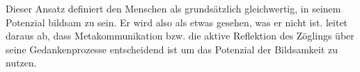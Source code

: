 Dieser Ansatz definiert den Menschen als grundsätzlich gleichwertig, in seinem Potenzial bildsam zu sein.
Er wird also als etwas gesehen, was er nicht ist.
\citeauthor{benner-2012} leitet daraus ab, dass Metakommunikation bzw. die aktive Reflektion des Zöglings über seine Gedankenprozesse entscheidend ist um das Potenzial der Bildsamkeit zu nutzen.

